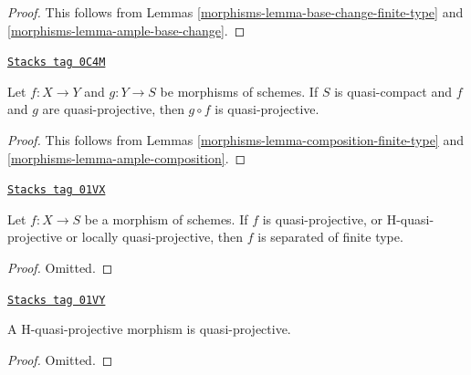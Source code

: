 \begin{proof}

This follows from
Lemmas \ref{morphisms-lemma-base-change-finite-type} and
\ref{morphisms-lemma-ample-base-change}.
\end{proof}

\begin{lemma}
\label{morphisms-lemma-composition-quasi-projective}
\href{https://stacks.math.columbia.edu/tag/0C4M}{\texttt{Stacks tag 0C4M}}

Let $f : X \to Y$ and $g : Y \to S$ be morphisms of schemes.
If $S$ is quasi-compact and $f$ and $g$ are quasi-projective,
then $g \circ f$ is quasi-projective.
\end{lemma}

\begin{proof}

This follows from
Lemmas \ref{morphisms-lemma-composition-finite-type} and
\ref{morphisms-lemma-ample-composition}.
\end{proof}

\begin{lemma}
\label{morphisms-lemma-quasi-projective-properties}
\href{https://stacks.math.columbia.edu/tag/01VX}{\texttt{Stacks tag 01VX}}

Let $f : X \to S$ be a morphism of schemes. If $f$ is quasi-projective,
or H-quasi-projective or locally quasi-projective, then $f$ is
separated of finite type.
\end{lemma}

\begin{proof}
Omitted.
\end{proof}

\begin{lemma}
\label{morphisms-lemma-H-quasi-projective-quasi-projective}
\href{https://stacks.math.columbia.edu/tag/01VY}{\texttt{Stacks tag 01VY}}

A H-quasi-projective morphism is quasi-projective.
\end{lemma}

\begin{proof}
Omitted.
\end{proof}

